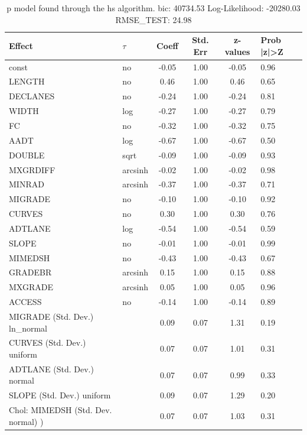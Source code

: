 \begin{table}
	\caption{p model found through the hs algorithm. bic: 40734.53 Log-Likelihood: -20280.03 RMSE_TEST: 24.98}
	\begin{center}
		\begin{tabular}{|l|l|c|c|c|l|}
			\hline
			Effect & $\tau$ & Coeff & Std. Err & z-values & Prob |z|>Z \\
			\hline
			const & no & -0.05 & 1.00 & -0.05 & 0.96 \\
			\hline
			LENGTH & no & 0.46 & 1.00 & 0.46 & 0.65 \\
			\hline
			DECLANES & no & -0.24 & 1.00 & -0.24 & 0.81 \\
			\hline
			WIDTH & log & -0.27 & 1.00 & -0.27 & 0.79 \\
			\hline
			FC & no & -0.32 & 1.00 & -0.32 & 0.75 \\
			\hline
			AADT & log & -0.67 & 1.00 & -0.67 & 0.50 \\
			\hline
			DOUBLE & sqrt & -0.09 & 1.00 & -0.09 & 0.93 \\
			\hline
			MXGRDIFF & arcsinh & -0.02 & 1.00 & -0.02 & 0.98 \\
			\hline
			MINRAD & arcsinh & -0.37 & 1.00 & -0.37 & 0.71 \\
			\hline
			MIGRADE & no & -0.10 & 1.00 & -0.10 & 0.92 \\
			\hline
			CURVES & no & 0.30 & 1.00 & 0.30 & 0.76 \\
			\hline
			ADTLANE & log & -0.54 & 1.00 & -0.54 & 0.59 \\
			\hline
			SLOPE & no & -0.01 & 1.00 & -0.01 & 0.99 \\
			\hline
			MIMEDSH & no & -0.43 & 1.00 & -0.43 & 0.67 \\
			\hline
			GRADEBR & arcsinh & 0.15 & 1.00 & 0.15 & 0.88 \\
			\hline
			MXGRADE & arcsinh & 0.05 & 1.00 & 0.05 & 0.96 \\
			\hline
			ACCESS & no & -0.14 & 1.00 & -0.14 & 0.89 \\
			\hline
			MIGRADE (Std. Dev.) ln_normal &  & 0.09 & 0.07 & 1.31 & 0.19 \\
			\hline
			CURVES (Std. Dev.) uniform &  & 0.07 & 0.07 & 1.01 & 0.31 \\
			\hline
			ADTLANE (Std. Dev.) normal &  & 0.07 & 0.07 & 0.99 & 0.33 \\
			\hline
			SLOPE (Std. Dev.) uniform &  & 0.09 & 0.07 & 1.29 & 0.20 \\
			\hline
			 Chol: MIMEDSH (Std. Dev. normal) ) &  & 0.07 & 0.07 & 1.03 & 0.31 \\

\end{tabular}
\end{center}
\end{table}
